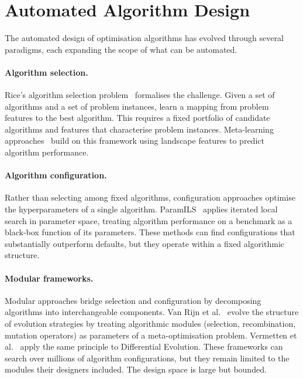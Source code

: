 
\section{Automated Algorithm Design}
\label{sec:bg-aad}

The automated design of optimisation algorithms has evolved through several paradigms, each expanding the scope of what can be automated.

\paragraph{Algorithm selection.}
Rice's algorithm selection problem~\cite{rice1976algorithmselection} formalises the challenge. Given a set of algorithms and a set of problem instances, learn a mapping from problem features to the best algorithm. This requires a fixed portfolio of candidate algorithms and features that characterise problem instances. Meta-learning approaches~\cite{smithmiles2009meta} build on this framework using landscape features to predict algorithm performance.

\paragraph{Algorithm configuration.}
Rather than selecting among fixed algorithms, configuration approaches optimise the hyperparameters of a single algorithm. ParamILS~\cite{hutter2009paramils} applies iterated local search in parameter space, treating algorithm performance on a benchmark as a black-box function of its parameters. These methods can find configurations that substantially outperform defaults, but they operate within a fixed algorithmic structure.

\paragraph{Modular frameworks.}
Modular approaches bridge selection and configuration by decomposing algorithms into interchangeable components. Van Rijn et al.~\cite{vanRijn2016modular} evolve the structure of evolution strategies by treating algorithmic modules (selection, recombination, mutation operators) as parameters of a meta-optimisation problem. Vermetten et al.~\cite{vermetten2023modde} apply the same principle to Differential Evolution. These frameworks can search over millions of algorithm configurations, but they remain limited to the modules their designers included. The design space is large but bounded.

